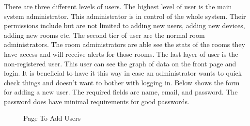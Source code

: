 \documentclass{report}
\begin{document}
There are three different levels of users.
The highest level of user is the main system administrator.
This administrator is in control of the whole system. 
Their permissions include but are not limited to adding new users, adding new devices, adding new rooms etc. 
The second tier of user are the normal room administrators.
The room administrators are able see the stats of the rooms they have access and will receive alerts for those rooms.
The last layer of user is the non-registered user. 
This user can see the graph of data on the front page and login. 
It is beneficial to have it this way in case an administrator wants to quick check things and doesn't want to bother with logging in.
Below shows the form for adding a new user. The required fields are name, email, and password. 
The password does have minimal requirements for good passwords.
\begin{figure}[H]
\caption{Page To Add Users}
\end{figure}
\end{document}
